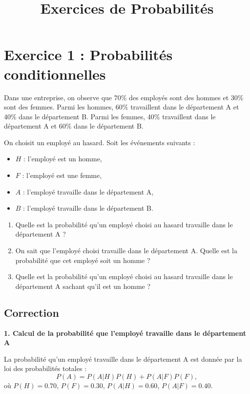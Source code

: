 \documentclass[a4paper,12pt]{article}
\title{Exercices de Probabilités}
\author{}
\date{}
\begin{document}
\maketitle

\section*{Exercice 1 : Probabilités conditionnelles}

Dans une entreprise, on observe que 70\% des employés sont des hommes et 30\% sont des femmes. Parmi les hommes, 60\% travaillent dans le département A et 40\% dans le département B. Parmi les femmes, 40\% travaillent dans le département A et 60\% dans le département B.

On choisit un employé au hasard. Soit les événements suivants :
\begin{itemize}
    \item $H$ : l’employé est un homme,
    \item $F$ : l’employé est une femme,
    \item $A$ : l’employé travaille dans le département A,
    \item $B$ : l’employé travaille dans le département B.
\end{itemize}

\begin{enumerate}
    \item Quelle est la probabilité qu’un employé choisi au hasard travaille dans le département A ?
    \item On sait que l’employé choisi travaille dans le département A. Quelle est la probabilité que cet employé soit un homme ?
    \item Quelle est la probabilité qu’un employé choisi au hasard travaille dans le département A sachant qu’il est un homme ?
\end{enumerate}

\subsection*{Correction}

\textbf{1. Calcul de la probabilité que l’employé travaille dans le département A}

La probabilité qu’un employé travaille dans le département A est donnée par la loi des probabilités totales :
\[
P(A) = P(A | H)P(H) + P(A | F)P(F),
\]
où $P(H) = 0.70$, $P(F) = 0.30$, $P(A | H) = 0.60$, $P(A | F) = 0.40$.
\end{document}
